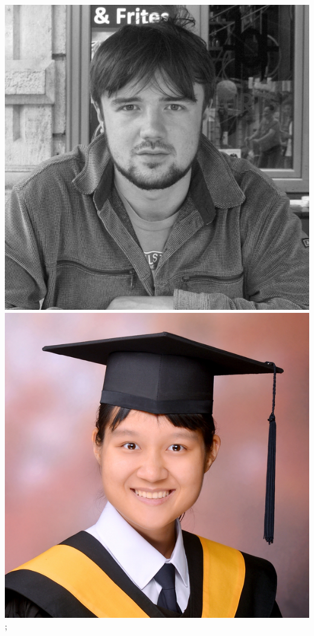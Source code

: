 \documentclass[aspectratio=169]{beamer}
\begin{document}
\begin{frame}
{        \includegraphics[width=0.09\textheight]{figures/students/sam_leeney.jpg}%
        \includegraphics[width=0.09\textheight]{figures/students/wei-ning_deng.jpg}%
    };

\end{frame}
\end{document}
